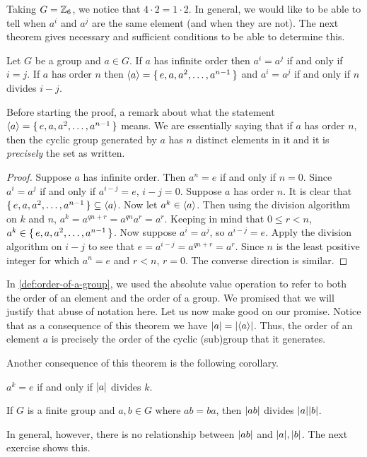 \documentclass[./main.tex]{subfiles}
\begin{document}
Taking $G = \mathbb{Z}_6$, we notice that $4 \cdot 2 = 1 \cdot 2$. In general, we would
like to be able to tell when $a^i$ and $a^j$ are the same element (and when they
are not). The next theorem gives necessary and sufficient conditions to be able
to determine this.

\begin{theorem}
    Let $G$ be a group and $a \in G$. If $a$ has infinite order then $a^i = a^j$
    if and only if $i=j$. If $a$ has order $n$ then ${ \langle a \rangle } = \set{e, a, a^2,
    \dots, a^{n-1}}$ and $a^i = a^j$ if and only if $n$ divides $i-j$.
\end{theorem}
Before starting the proof, a remark about what the statement ${ \langle a \rangle } = \set{e,
a, a^2, \dots, a^{n-1}}$ means. We are essentially saying that if $a$ has order
$n$, then the cyclic group generated by $a$ has $n$ distinct elements in it and
it is \emph{precisely} the set as written.
\begin{proof}
    Suppose $a$ has infinite order. Then $a^n = e$ if and only if $n=0$. Since
    $a^i = a^j$ if and only if $a^{i-j} = e$, $i-j=0$. Suppose $a$ has order
    $n$. It is clear that $\set{e, a, a^2, \dots, a^{n-1}} \subseteq { \langle a \rangle }$.
    Now let $a^k \in { \langle a \rangle }$. Then using the division algorithm on $k$ and $n$,
    $a^k = a^{qn + r} = a^{qn} a^r = a^r$. Keeping in mind that $0 \leq r < n$,
    $a^k \in \set{e, a, a^2, \dots, a^{n-1}}$. Now suppose $a^i = a^j$, so
    $a^{i-j} = e$. Apply the division algorithm on $i-j$ to see that $e =
    a^{i-j} = a^{qn + r} = a^r$. Since $n$ is the least positive integer for
    which $a^n = e$ and $r < n$, $r=0$. The converse direction is similar.
\end{proof}

In \cref{def:order-of-a-group}, we used the absolute value operation to refer to
both the order of an element and the order of a group. We promised that we will
justify that abuse of notation here. Let us now make good on our promise. Notice
that as a consequence of this theorem we have $\abs{a} = \abs{\gen{a}}$. Thus,
the order of an element $a$ is precisely the order of the cyclic (sub)group that
it generates. 

Another consequence of this theorem is the following corollary.
\begin{corollary}
    $a^k = e$ if and only if $\abs{a}$ divides $k$. 
\end{corollary}

\begin{corollary}
    If $G$ is a finite group and $a, b \in G$ where $ab=ba$, then $\abs{ab}$
    divides $\abs a \abs b$.
\end{corollary}
In general, however, there is no relationship between $\abs{ab}$ and $\abs a,
\abs b$. The next exercise shows this.
\end{document}
